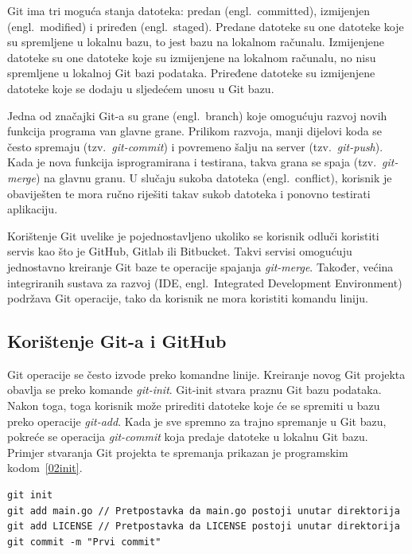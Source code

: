 Git ima tri moguća stanja datoteka: predan (engl.~committed), izmijenjen (engl.~modified) i priređen
(engl.~staged). Predane datoteke su one datoteke koje su spremljene u lokalnu bazu, to jest bazu na
lokalnom računalu. Izmijenjene datoteke su one datoteke koje su izmijenjene na lokalnom računalu, no
nisu spremljene u lokalnoj Git bazi podataka. Priređene datoteke su izmijenjene datoteke koje se
dodaju u sljedećem unosu u Git bazu.

Jedna od značajki Git-a su grane (engl.~branch) koje omogućuju razvoj novih funkcija programa van
glavne grane. Prilikom razvoja, manji dijelovi koda se često spremaju (tzv.~\textit{git-commit}) i
povremeno šalju na server (tzv.~\textit{git-push}). Kada je nova funkcija isprogramirana i
testirana, takva grana se spaja (tzv.~\textit{git-merge}) na glavnu granu. U slučaju sukoba datoteka
(engl.~conflict), korisnik je obaviješten te mora ručno riješiti takav sukob datoteka i ponovno
testirati aplikaciju.

Korištenje Git uvelike je pojednostavljeno ukoliko se korisnik odluči koristiti servis kao što je
GitHub, Gitlab ili Bitbucket. Takvi servisi omogućuju jednostavno kreiranje Git baze te operacije
spajanja \textit{git-merge}. Također, većina integriranih sustava za razvoj (IDE, engl.~Integrated
Development Environment) podržava Git operacije, tako da korisnik ne mora koristiti komandu liniju.

\subsection{Korištenje Git-a i GitHub}
Git operacije se često izvode preko komandne linije. Kreiranje novog Git projekta obavlja se preko
komande \textit{git-init}. Git-init stvara praznu Git bazu podataka. Nakon toga, toga korisnik može
prirediti datoteke koje će se spremiti u bazu preko operacije \textit{git-add}. Kada je sve spremno
za trajno spremanje u Git bazu, pokreće se operacija \textit{git-commit} koja predaje datoteke u
lokalnu Git bazu. Primjer stvaranja Git projekta te spremanja prikazan je programskim
kodom~\ref{02init}.

\begin{lstlisting}
git init
git add main.go // Pretpostavka da main.go postoji unutar direktorija
git add LICENSE // Pretpostavka da LICENSE postoji unutar direktorija
git commit -m "Prvi commit"
\end{lstlisting}

